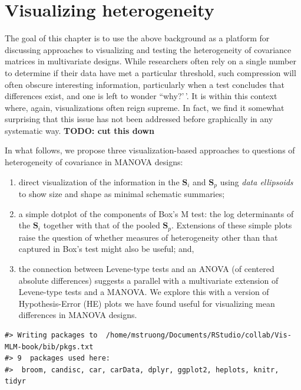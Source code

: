 \documentclass[
  letterpaper,
  10pt,
  krantz2]{krantz}
\begin{document}
\section{Visualizing heterogeneity}\label{visualizing-heterogeneity}

The goal of this chapter is to use the above background as a platform
for discussing approaches to visualizing and testing the heterogeneity
of covariance matrices in multivariate designs. While researchers often
rely on a single number to determine if their data have met a particular
threshold, such compression will often obscure interesting information,
particularly when a test concludes that differences exist, and one is
left to wonder ``why?'\,'. It is within this context where, again,
visualizations often reign supreme. In fact, we find it somewhat
surprising that this issue has not been addressed before graphically in
any systematic way. \textbf{TODO: cut this down}

In what follows, we propose three visualization-based approaches to
questions of heterogeneity of covariance in MANOVA designs:

\begin{enumerate}
\def\labelenumi{(\alph{enumi})}
\item
  direct visualization of the information in the \(\mathbf{S}_i\) and
  \(\mathbf{S}_p\) using \emph{data ellipsoids} to show size and shape
  as minimal schematic summaries;
\item
  a simple dotplot of the components of Box's M test: the log
  determinants of the \(\mathbf{S}_i\) together with that of the pooled
  \(\mathbf{S}_p\). Extensions of these simple plots raise the question
  of whether measures of heterogeneity other than that captured in Box's
  test might also be useful; and,
\item
  the connection between Levene-type tests and an ANOVA (of centered
  absolute differences) suggests a parallel with a multivariate
  extension of Levene-type tests and a MANOVA. We explore this with a
  version of Hypothesis-Error (HE) plots we have found useful for
  visualizing mean differences in MANOVA designs.
\end{enumerate}

\begin{verbatim}
#> Writing packages to  /home/mstruong/Documents/RStudio/collab/Vis-MLM-book/bib/pkgs.txt
#> 9  packages used here:
#>  broom, candisc, car, carData, dplyr, ggplot2, heplots, knitr, tidyr
\end{verbatim}
\end{document}
